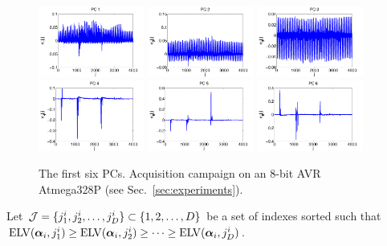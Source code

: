 \begin{figure}
\includegraphics[width=0.31\textwidth]{figures/PC1.pdf} 
\includegraphics[width=0.31\textwidth]{figures/PC2.pdf} 
\includegraphics[width=0.31\textwidth]{figures/PC3.pdf} \\
\includegraphics[width=0.31\textwidth]{figures/PC4.pdf} 
\includegraphics[width=0.31\textwidth]{figures/PC5.pdf} 
\includegraphics[width=0.31\textwidth]{figures/PC6.pdf} 
\caption{The first six PCs. Acquisition campaign on an 8-bit AVR Atmega328P (see Sec.~\ref{sec:experiments}).}\label{fig:6components}
\end{figure}
Let $\mathcal{J}=\{j^i_1, j^i_2, \dots, j^i_{D}\}\subset\{1,2,\dots,D\}$ be a set of indexes sorted such that $\mathrm{ELV}(\boldsymbol\alpha_i,j^i_1)\geq \mathrm{ELV}(\boldsymbol\alpha_i,j^i_2)\geq \dots \geq \mathrm{ELV}(\boldsymbol\alpha_i,j^i_D)$.
